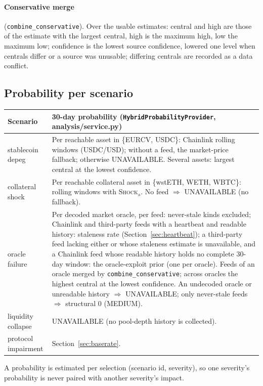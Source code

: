 \documentclass[11pt,a4paper]{article}
\newcommand{\code}[1]{\texttt{#1}}
\newcommand{\src}[1]{\textsf{\small #1}}
\begin{document}
\paragraph{Conservative merge} (\code{combine\_conservative}). Over the usable
estimates: central and high are those of the estimate with the largest central,
high is the maximum high, low the maximum low; confidence is the lowest source
confidence, lowered one level when centrals differ or a source was unusable;
differing centrals are recorded as a data conflict.

\subsection{Probability per scenario}

\begin{center}\small
\begin{tabularx}{\textwidth}{@{}L{2.9cm}Y@{}}
\toprule
Scenario & 30-day probability (\code{HybridProbabilityProvider}, \src{analysis/service.py}) \\
\midrule
stablecoin depeg & Per reachable asset in \{EURCV, USDC\}: Chainlink rolling windows (USDC/USD); without a feed, the market-price fallback; otherwise UNAVAILABLE. Several assets: largest central at the lowest confidence. \\
collateral shock & Per reachable collateral asset in \{wstETH, WETH, WBTC\}: rolling windows with \textsc{Shock}$_s$. No feed $\Rightarrow$ UNAVAILABLE (no fallback). \\
oracle failure & Per decoded market oracle, per feed: never-stale kinds excluded; Chainlink and third-party feeds with a heartbeat and readable history: staleness rate (Section~\ref{sec:heartbeat}); a third-party feed lacking either or whose staleness estimate is unavailable, and a Chainlink feed whose readable history holds no complete 30-day window: the oracle-exploit prior (one per oracle). Feeds of an oracle merged by \code{combine\_conservative}; across oracles the highest central at the lowest confidence. An undecoded oracle or unreadable history $\Rightarrow$ UNAVAILABLE; only never-stale feeds $\Rightarrow$ structural 0 (MEDIUM). \\
liquidity collapse & UNAVAILABLE (no pool-depth history is collected). \\
protocol impairment & Section~\ref{sec:baserate}. \\
\bottomrule
\end{tabularx}
\end{center}
A probability is estimated per selection (scenario id, severity), so one
severity's probability is never paired with another severity's impact.
\end{document}
